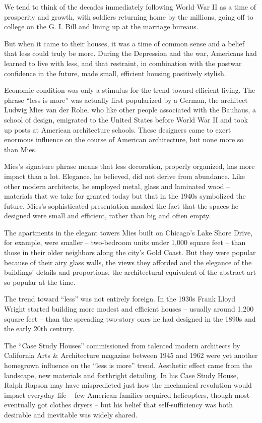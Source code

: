 We tend to think of the decades immediately following World War II as a time of prosperity and growth, with soldiers returning home by the millions, going off to college on the G. I. Bill and lining up at the marriage bureaus.


But when it came to their houses, it was a time of common sense and a belief that less could truly be more. During the Depression and the war, Americans had learned to live with less, and that restraint, in combination with the postwar confidence in the future, made small, efficient housing positively stylish.


Economic condition was only a stimulus for the trend toward efficient living. The phrase ``less is more'' was actually first popularized by a German, the architect Ludwig Mies van der Rohe, who like other people associated with the Bauhaus, a school of design, emigrated to the United States before World War II and took up posts at American architecture schools. These designers came to exert enormous influence on the course of American architecture, but none more so than Mies.


Mies's signature phrase means that less decoration, properly organized, has more impact than a lot. Elegance, he believed, did not derive from abundance. Like other modern architects, he employed metal, glass and laminated wood – materials that we take for granted today but that in the 1940s symbolized the future. Mies's sophisticated presentation masked the fact that the spaces he designed were small and efficient, rather than big and often empty.


The apartments in the elegant towers Mies built on Chicago's Lake Shore Drive, for example, were smaller – two-bedroom units under 1,000 square feet – than those in their older neighbors along the city's Gold Coast. But they were popular because of their airy glass walls, the views they afforded and the elegance  of the buildings' details and proportions, the architectural equivalent of the abstract art so popular at the time.


The trend toward ``less'' was not entirely foreign. In the 1930s Frank Lloyd Wright started building more modest and efficient houses – usually around 1,200 square feet – than the spreading two-story ones he had designed in the 1890s and the early 20th century.


The ``Case Study Houses'' commissioned from talented modern architects by California Arts \& Architecture magazine between 1945 and 1962 were yet another homegrown influence on the ``less is more'' trend. Aesthetic effect came from the landscape, new materials and forthright detailing. In his Case Study House, Ralph Rapson may have mispredicted just how the mechanical revolution would impact everyday life – few American families acquired helicopters, though most eventually got clothes dryers – but his belief that self-sufficiency was both desirable and inevitable was widely shared.